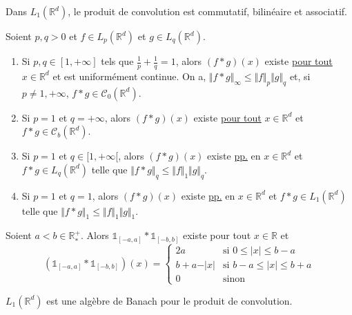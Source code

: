   \begin{proposition}
    Dans $L_1(\mathbb{R}^d)$, le produit de convolution est commutatif, bilinéaire et associatif.
  \end{proposition}

  \begin{theorem}
    Soient $p, q > 0$ et $f \in L_p(\mathbb{R}^d)$ et $g \in L_q(\mathbb{R}^d)$.
    \begin{enumerate}[label={\bfseries(\roman*)}]
      \item Si $p, q \in [1, +\infty]$ tels que $\frac{1}{p} + \frac{1}{q} = 1$, alors $(f * g)(x)$ existe \uline{pour tout} $x \in \mathbb{R}^d$ et est uniformément continue. On a, $\Vert f * g \Vert_\infty \leq \Vert f \Vert_p \Vert g \Vert_q$ et, si $p \neq 1, +\infty$, $f * g \in \mathcal{C}_0(\mathbb{R}^d)$.
      \item Si $p = 1$ et $q = +\infty$, alors $(f * g)(x)$ existe \uline{pour tout} $x \in \mathbb{R}^d$ et $f * g \in \mathcal{C}_b(\mathbb{R}^d)$.
      \item Si $p = 1$ et $q \in [1, +\infty[$, alors $(f * g)(x)$ existe \uline{pp.} en $x \in \mathbb{R}^d$ et $f * g \in L_q(\mathbb{R}^d)$ telle que $\Vert f * g \Vert_q \leq \Vert f \Vert_1 \Vert g \Vert_q$.
      \item Si $p = 1$ et $q = 1$, alors $(f * g)(x)$ existe \uline{pp.} en $x \in \mathbb{R}^d$ et $f * g \in L_1(\mathbb{R}^d)$ telle que $\Vert f * g \Vert_1 \leq \Vert f \Vert_1 \Vert g \Vert_1$.
    \end{enumerate}
  \end{theorem}

  \begin{example}
    Soient $a < b \in \mathbb{R}^+_*$. Alors $\mathbb{1}_{[-a, a]} * \mathbb{1}_{[-b,b]}$ existe pour tout $x \in \mathbb{R}$ et
    \[ \left( \mathbb{1}_{[-a, a]} * \mathbb{1}_{[-b,b]} \right)(x) =
    \begin{cases}
      2a &\text{si } 0 \leq \vert x \vert \leq b-a \\
      b+a-\vert x \vert &\text{si } b-a \leq \vert x \vert \leq b+a \\
      0 &\text{sinon}
    \end{cases}
    \]
  \end{example}


  \begin{proposition}
    $L_1(\mathbb{R}^d)$ est une algèbre de Banach pour le produit de convolution.
  \end{proposition}

